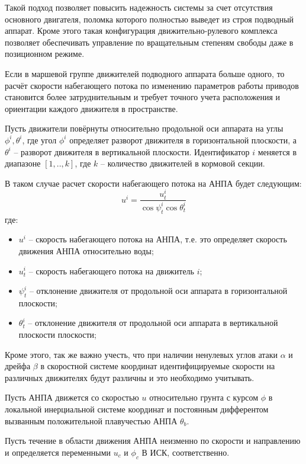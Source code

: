 Такой подход позволяет повысить надежность системы за счет отсутствия основного двигателя, поломка которого полностью выведет из строя подводный аппарат.
Кроме этого такая конфигурация движительно-рулевого комплекса позволяет обеспечивать управление по вращательным степеням свободы даже в позиционном режиме.

Если в маршевой группе движителей подводного аппарата больше одного, то расчёт скорости набегающего потока по изменению параметров работы приводов становится более затруднительным и требует точного учета расположения и ориентации каждого движителя в пространстве.

Пусть движители повёрнуты относительно продольной оси аппарата на углы $\phi^i, \theta^i$, где угол $\phi^i$ определяет разворот движителя в горизонтальной плоскости, а $\theta^i$ -- разворот движителя в вертикальной плоскости.
Идентификатор $i$ меняется в диапазоне $[1,..,k]$, где $k$ -- количество движителей в кормовой секции.

В таком случае расчет скорости набегающего потока на АНПА будет следующим:
\begin{equation}
    \label{eq:velocity_orientation}
    u^i = \frac{u^i_t}{\cos{\psi^i_t}\cos{\theta^i_t}}
\end{equation}
\noindent где:
\begin{itemize}
    \item $u^i$ -- скорость набегающего потока на АНПА, т.е. это определяет скорость движения АНПА относительно воды;
    \item $u^i_t$ -- скорость набегающего потока на движитель $i$;
    \item $\psi^i_t$ -- отклонение движителя от продольной оси аппарата в горизонтальной плоскости;
    \item $\theta^i_t$ -- отклонение движителя от продольной оси аппарата в вертикальной плоскости плоскости;
\end{itemize}

Кроме этого, так же важно учесть, что при наличии ненулевых углов атаки $\alpha$ и дрейфа $\beta$ в скоростной системе координат идентифицируемые скорости на различных движителях будут различны и это необходимо учитывать.

Пусть АНПА движется со скоростью $u$ относительно грунта с курсом $\phi$ в локальной инерциальной системе координат и постоянным дифферентом вызванным положительной плавучестью АНПА $\theta_b$.

Пусть течение в области движения АНПА неизменно по скорости и направлению и определяется переменными $u_c$ и $\phi_c$ В ИСК, соответственно.

